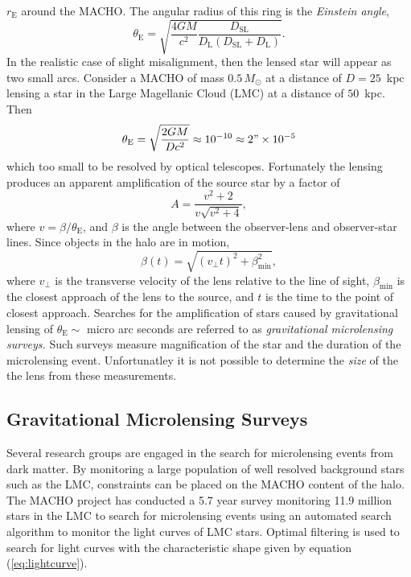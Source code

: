 $r_\mathrm{E}$ around the MACHO. The angular radius of this ring is the
\emph{Einstein angle},
\begin{equation}
\theta_\mathrm{E} = \sqrt{\frac{4GM}{c^2} \frac{D_\mathrm{SL}}
{D_\mathrm{L}\left(D_\mathrm{SL} + D_\mathrm{L}\right)}}.
\end{equation}
In the realistic case of slight misalignment, then the lensed star will appear
as two small arcs. Consider a MACHO of mass $0.5\,M_\odot$ at a distance of $D
= 25$~kpc lensing a star in the Large Magellanic Cloud (LMC) at a distance of
$50$~kpc. Then
\begin{equation}
\theta_\mathrm{E} = \sqrt{\frac{2GM}{Dc^2}} \approx 10^{-10} \approx 2" \times
10^{-5}
\end{equation}
which too small to be resolved by optical telescopes. Fortunately the lensing
produces an apparent amplification of the source star by a factor
of\cite{1964MNRAS.128..295R}
\begin{equation}
A = \frac{v^2 + 2}{v\sqrt{v^2 + 4}},
\label{eq:lightcurve}
\end{equation}
where $v = \beta / \theta_\mathrm{E}$, and $\beta$ is the angle between the
observer-lens and observer-star lines. Since objects in the halo are in
motion,
\begin{equation}
\beta(t) = \sqrt{ (v_\perp t)^2 + \beta_\mathrm{min}^2 },
\end{equation}
where $v_\perp$ is the transverse velocity of the lens relative to the 
line of sight, $\beta_\mathrm{min}$ is the closest approach of the lens to
the source, and $t$ is the time to the point of closest
approach\cite{Paczynski:1985jf,Griest:1990vu}. 
Searches for the amplification of stars caused by gravitational lensing of
$\theta_\mathrm{E} \sim $ micro arc seconds are referred to as
\emph{gravitational microlensing surveys.} Such surveys measure
magnification of the star and the duration of the microlensing event. 
Unfortunatley it is not possible to determine the \emph{size} of the
the lens from these measurements.

\subsection{Gravitational Microlensing Surveys}

Several research groups are engaged in the search for microlensing events from
dark matter\cite{Alcock:2000ph,Afonso:2002xq}. By monitoring a large
population of well resolved background stars such as the LMC, constraints can
be placed on the MACHO content of the halo. The MACHO project has conducted a
5.7 year survey monitoring 11.9 million stars in the LMC to search for
microlensing events\cite{Alcock:2000ph} using an automated search algorithm to
monitor the light curves of LMC stars. Optimal filtering is used to search for
light curves with the characteristic shape given by equation
(\ref{eq:lightcurve}).

